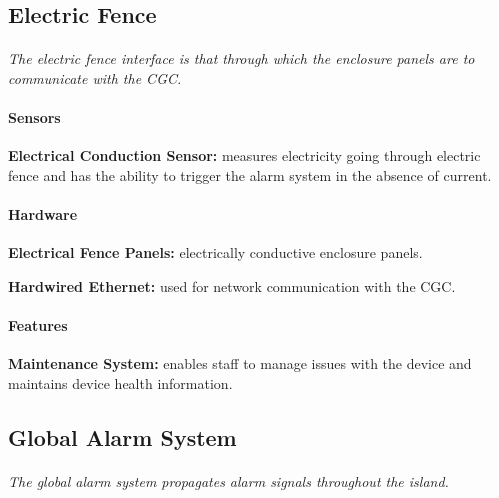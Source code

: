 \documentclass[12pt]{article}
\begin{document}
    \subsection{Electric Fence}
    \paragraph{} \textit{The electric fence interface is that through which the enclosure
    panels are to communicate with the CGC.}
    
    \paragraph{Sensors}
    \begin{list}{}{}
        \item \textbf{Electrical Conduction Sensor:} measures electricity going through 
        electric fence and has the ability to trigger the alarm system in the absence of 
        current. 
    \end{list}
        
    \paragraph{Hardware}
    \begin{list}{}{}
        \item \textbf{Electrical Fence Panels:} electrically conductive enclosure panels.
        \item \textbf{Hardwired Ethernet:} used for network communication with the CGC. 
    \end{list}
    
    \paragraph{Features}
    \begin{list}{}{}
        \item \textbf{Maintenance System:} enables staff to manage issues with the device    and 
        maintains device health information.
    \end{list}

    \subsection{Global Alarm System}
    \paragraph{} \textit{The global alarm system propagates alarm signals throughout the island.}
\end{document}

